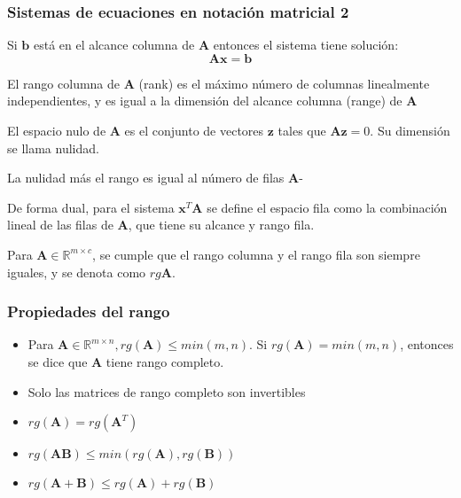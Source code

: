 \documentclass{beamer}
\begin{document}
\begin{frame}
\frametitle{Sistemas de ecuaciones en notación matricial 2}
Si $ \boldsymbol{b}$ está en el alcance columna de $\boldsymbol{A}$ entonces el sistema tiene solución:
\begin{equation*}
\boldsymbol{A}\boldsymbol{x}= \boldsymbol{b}
\end{equation*}

El rango columna de $\boldsymbol{A}$ (rank) es el máximo número de columnas linealmente independientes, y es igual a la dimensión del alcance columna (range) de $\boldsymbol{A}$ 

El espacio nulo de $\boldsymbol{A}$ es el conjunto de vectores $\boldsymbol{z}$ tales que $\boldsymbol{Az}=0$. Su dimensión se llama nulidad. 

La nulidad más el rango es igual al número de filas $\boldsymbol{A}$- 

De forma dual, para el sistema $\boldsymbol{x}^T \boldsymbol{A}$ se define el espacio fila como la combinación lineal de las filas de $\boldsymbol{A}$, que tiene su alcance y rango fila.

Para $\boldsymbol{A}\in \mathbb{R}^{m\times c}$, se cumple que el rango columna y el rango fila son siempre iguales, y se denota como $rg\boldsymbol{A}$. 

\end{frame}

\begin{frame}
\frametitle{Propiedades del rango}
\begin{itemize}
\item Para $\boldsymbol{A} \in \mathbb{R}^{m\times n}, rg(\boldsymbol{A}) \leq min(m,n)$. Si $rg(\boldsymbol{A}) = min (m,n)$, entonces se dice que $\boldsymbol{A}$ tiene rango completo. 
\item Solo las matrices de rango completo son invertibles 
\item $rg(\boldsymbol{A})=rg(\boldsymbol{A}^T)$
\item $rg(\boldsymbol{AB}) \leq min (rg(\boldsymbol{A}),rg(\boldsymbol{B}))$
\item $rg(\boldsymbol{A+B}) \leq rg(\boldsymbol{A}) + rg(\boldsymbol{B})$
\end{itemize}

\end{frame}
\end{document}
